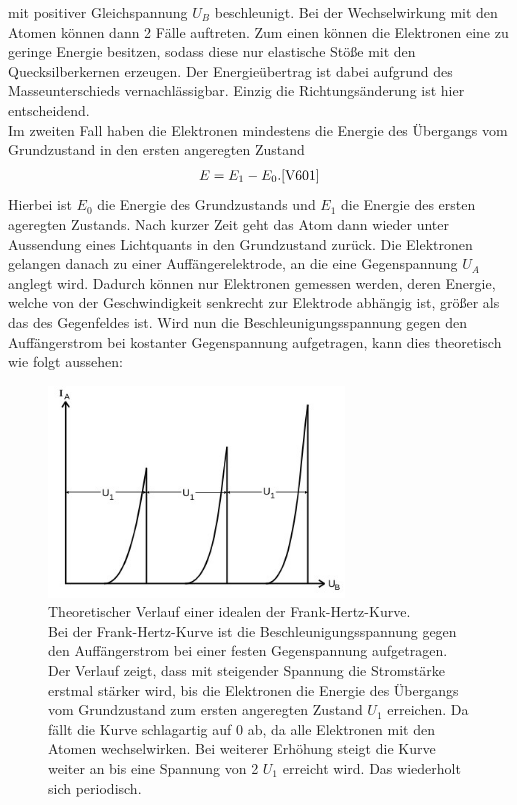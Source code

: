 mit positiver Gleichspannung $U_B$ beschleunigt. Bei der Wechselwirkung mit 
den Atomen können dann 2 Fälle auftreten. Zum einen können die Elektronen eine
zu geringe Energie besitzen, sodass diese nur elastische Stöße mit den Quecksilberkernen
erzeugen. Der Energieübertrag ist dabei aufgrund des Masseunterschieds vernachlässigbar.
Einzig die Richtungsänderung ist hier entscheidend.\\
Im zweiten Fall haben die Elektronen mindestens die Energie des Übergangs vom Grundzustand
in den ersten angeregten Zustand
\begin{align}
    E=E_1 -E_0 . \label{eq:2} \text{\cite{V601}}
\end{align}
Hierbei ist $E_0$ die Energie des Grundzustands und $E_1$ die Energie des ersten ageregten Zustands.
Nach kurzer Zeit geht das Atom dann wieder unter Aussendung eines Lichtquants in den Grundzustand zurück.
Die Elektronen gelangen danach zu einer Auffängerelektrode, an die eine Gegenspannung $U_A$ 
anglegt wird. Dadurch können nur Elektronen gemessen werden, deren Energie, welche von der 
Geschwindigkeit senkrecht zur Elektrode abhängig ist, größer als das des Gegenfeldes ist.
Wird nun die Beschleunigungsspannung gegen den Auffängerstrom bei kostanter Gegenspannung
aufgetragen, kann dies theoretisch wie folgt aussehen:
\begin{figure}[H]
    \centering
    \includegraphics[width=0.7\textwidth]{images/kurve.jpg}
    \caption{
        Theoretischer Verlauf einer idealen der Frank-Hertz-Kurve\cite{V601}.\\
        Bei der Frank-Hertz-Kurve ist die Beschleunigungsspannung gegen den
        Auffängerstrom bei einer festen Gegenspannung aufgetragen. Der Verlauf
        zeigt, dass mit steigender Spannung die Stromstärke erstmal stärker wird,
        bis die Elektronen die Energie des Übergangs vom Grundzustand zum ersten angeregten
        Zustand $U_1$ erreichen. Da fällt die Kurve schlagartig auf 0 ab, da alle Elektronen
        mit den Atomen wechselwirken. Bei weiterer Erhöhung steigt die Kurve weiter an
        bis eine Spannung von 2 $U_1$ erreicht wird. Das wiederholt sich periodisch.
    } 
    \label{fig:2}
\end{figure}
